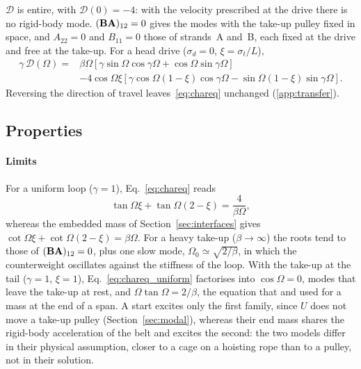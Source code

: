 $\mathcal D$ is entire, with $\mathcal D(0)=-4$: with the velocity prescribed at the drive there is
no rigid-body mode. $(\mathbf{B}\mathbf{A})_{12}=0$ gives the modes with the take-up pulley fixed in
space, and $A_{22}=0$ and $B_{11}=0$ those of strands~A and~B, each fixed at the drive and free
at the take-up. For a head drive ($\sigma_d=0$, $\xi=\sigma_t/L$),
\begin{equation}\label{eq:chareq_head}
  \begin{split}
  \gamma\,\mathcal D(\Omega)={}&\beta\Omega\left[\gamma\sin\Omega\cos\gamma\Omega+\cos\Omega\sin\gamma\Omega\right]\\
  &-4\cos\Omega\xi\left[\gamma\cos\Omega(1-\xi)\cos\gamma\Omega-\sin\Omega(1-\xi)\sin\gamma\Omega\right].
  \end{split}
\end{equation}
Reversing the direction of travel leaves~\eqref{eq:chareq} unchanged (\cref{app:transfer}).

\subsection{Properties}\label{sec:properties}

\paragraph{Limits} For a uniform loop ($\gamma=1$), Eq.~\eqref{eq:chareq} reads
\begin{equation}\label{eq:chareq_uniform}
  \tan\Omega\xi+\tan\Omega(2-\xi)=\frac{4}{\beta\Omega},
\end{equation}
whereas the embedded mass of Section~\ref{sec:interfaces} gives
$\cot\Omega\xi+\cot\Omega(2-\xi)=\beta\Omega$. For a heavy take-up ($\beta\to\infty$) the roots
tend to those of $(\mathbf{B}\mathbf{A})_{12}=0$, plus one slow mode,
$\Omega_0\simeq\sqrt{2/\beta}$, in which the counterweight oscillates against the stiffness of
the loop. With the take-up at the tail ($\gamma=1$, $\xi=1$), Eq.~\eqref{eq:chareq_uniform}
factorises into $\cos\Omega=0$, modes that leave the take-up at rest, and
$\Omega\tan\Omega=2/\beta$, the equation that \citet{pang2015} and \citet{li2018} used for a mass
at the end of a span. A start excites only the first family, since $U$ does not move a take-up
pulley (Section~\ref{sec:modal}), whereas their end mass shares the rigid-body acceleration of
the belt and excites the second: the two models differ in their physical assumption, closer to a
cage on a hoisting rope than to a pulley, not in their solution.

